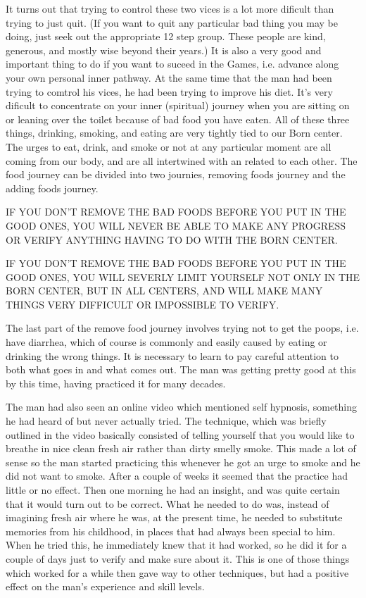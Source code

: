 \documentclass[12pt,letterpaper]{book}
\begin{document}
It turns out that trying to control these two vices is a lot more dificult than trying to just quit. (If you want to quit any particular bad thing you may be doing, just seek out the appropriate 12 step group. These people are kind, generous, and mostly wise beyond their years.) It is also a very good and important thing to do if you want to suceed in the Games, i.e. advance along your own personal inner pathway. At the same time that the man had been trying to comtrol his vices, he had been trying to improve his diet. It's very dificult to concentrate on your inner (spiritual) journey when you are sitting on or leaning over the toilet because of bad food you have eaten. All of these three things, drinking, smoking, and eating are very tightly tied to our Born center. The urges to eat, drink, and smoke or not at any particular moment are all coming from our body, and are all intertwined with an related to each other. The food journey can be divided into two journies, removing foods journey and the adding foods journey.

IF YOU DON'T REMOVE THE BAD FOODS BEFORE YOU PUT IN THE GOOD ONES, YOU WILL NEVER BE ABLE TO MAKE ANY PROGRESS OR VERIFY ANYTHING HAVING TO DO WITH THE BORN CENTER. 

IF YOU DON'T REMOVE THE BAD FOODS BEFORE YOU PUT IN THE GOOD ONES, YOU WILL SEVERLY LIMIT YOURSELF NOT ONLY IN THE BORN CENTER, BUT IN ALL CENTERS, AND WILL MAKE MANY THINGS VERY DIFFICULT OR IMPOSSIBLE TO VERIFY.

The last part of the remove food journey involves trying not to get the poops, i.e. have diarrhea, which of course is commonly and easily caused by eating or drinking the wrong things. It is necessary to learn to pay careful attention to both what goes in and what comes out. The man was getting pretty good at this by this time, having practiced it for many decades.

The man had also seen an online video which mentioned self hypnosis, something he had heard of but never actually tried. The technique, which was briefly outlined in the video basically consisted of telling yourself that you would like to breathe in nice clean fresh air rather than dirty smelly smoke. This made a lot of sense so the man started practicing this whenever he got an urge to smoke and he did not want to smoke. After a couple of weeks it seemed that the practice had little or no effect. Then one morning he had an insight, and was quite certain that it would turn out to be correct. What he needed to do was, instead of imagining fresh air where he was, at the present time, he needed to substitute memories from his childhood, in places that had always been special to him. When he tried this, he immediately knew that it had worked, so he did it for a couple of days just to verify and make sure about it. This is one of those things which worked for a while then gave way to other techniques, but had a positive effect on the man's experience and skill levels.
\end{document}
